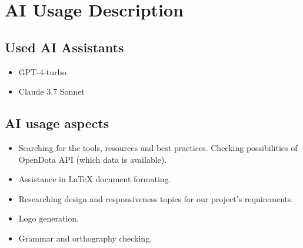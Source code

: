 \section{AI Usage Description}

\subsection{Used AI Assistants}

\begin{itemize}
    \item GPT-4-turbo
    \item Claude 3.7 Sonnet
\end{itemize}

\subsection{AI usage aspects}

\begin{itemize}

    \item Searching for the tools, resources and best practices. Checking possibilities of OpenDota API (which data is available).
    \item Assistance in LaTeX document formating.
    \item Researching design and responsiveness topics for our project's requirements.
    \item Logo generation.
    \item Grammar and orthography checking.

\end{itemize}



